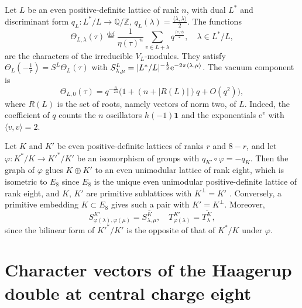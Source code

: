 \documentclass[leqno]{article}
\newcommand{\Z}{\ensuremath{\mathbb{Z}}}
\newcommand{\la}{\langle}
\newcommand{\ra}{\rangle}
\newcommand{\co}{\colon}
\newcommand{\ovl}{\overline}
\let\i\relax
\newcommand{\i}{\mathrm{i}}
\newcommand{\ov}{\overset}
\newcommand{\e}{\mathrm{e}}
\numberwithin{equation}{section}
\begin{document}
Let $L$ be an even positive-definite lattice of rank $n$, with dual $L^*$ and discriminant form $q_L \co L^*/L \to \mathbb{Q}/\Z$, $q_L(\lambda) = \frac{\la\lambda,\lambda\ra}{2}$. The functions
\begin{equation}
\label{eq:lattice-characters}
\Theta_{L,\lambda}(\tau) \ov{\mathrm{def}}{=} \frac{1}{\eta(\tau)^n}\sum_{v \in L+\lambda}q^{\frac{\la v,v\ra}{2}},\quad \lambda \in L^*/L,
\end{equation}
are the characters of the irreducible $V_L$-modules. They satisfy $\Theta_L(-\frac{1}{\tau}) = S^L\Theta_L(\tau)$ with $S^L_{\lambda,\mu} = |L^*/L|^{-\frac12}\e^{-2\pi\i\la\lambda,\mu\ra}$. The vacuum component is
\begin{equation}
\label{eq:lattice-vacuum}
\Theta_{L,0}(\tau) = q^{-\frac{n}{24}}\big(1+(n+|R(L)|)q+O(q^2)\big),
\end{equation}
where $R(L)$ is the set of roots, namely vectors of norm two, of $L$. Indeed, the coefficient of $q$ counts the $n$ oscillators $h(-1)\mathbf 1$ and the exponentials $\e^{v}$ with $\la v,v\ra = 2$.

Let $K$ and $K'$ be even positive-definite lattices of ranks $r$ and $8-r$, and let $\varphi \co K^*/K \to K'^*/K'$ be an isomorphism of groups with $q_{K'} \circ \varphi = -q_K$. Then the graph of $\varphi$ glues $K \oplus K'$ to an even unimodular lattice of rank eight, which is isometric to $E_8$ since $E_8$ is the unique even unimodular positive-definite lattice of rank eight, and $K$, $K'$ are primitive sublattices with $K^\perp = K'$ \cite[Propositions 1.4.1 and 1.6.1]{Nik80}. Conversely, a primitive embedding $K \subset E_8$ gives such a pair with $K' = K^\perp$. Moreover,
\begin{equation}
\label{eq:conjugate-S}
S^{K'}_{\varphi(\lambda),\varphi(\mu)} = \ovl{S^K_{\lambda,\mu}},\quad T^{K'}_{\varphi(\lambda)} = \ovl{T^K_\lambda},
\end{equation}
since the bilinear form of $K'^*/K'$ is the opposite of that of $K^*/K$ under $\varphi$.

\section{Character vectors of the Haagerup double at central charge eight}
\label{sec:c8}
\end{document}
